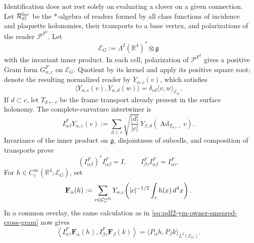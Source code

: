 Identification does not rest solely on evaluating a clover on a given connection.
Let $\mathcal R_G^{\rm loc}$ be the $*$-algebra of readers formed by all
class functions of incidence and plaquette holonomies, their transports to a
base vertex, and polarizations of the reader $\mathcal P^{F^2}$. Let
\begin{equation}\label{eq:pdf2-ym-owner-curvature-fibre}
 \mathcal E_G:=\Lambda^2(\mathbb R^4)^*\otimes\mathfrak g
\end{equation}
with the invariant inner product. In each cell, polarization of
$\mathcal P^{F^2}$ gives a positive Gram form $G_{\alpha,c}^{F}$ on
$\mathcal E_G$. Quotient by its kernel and apply its positive square root; denote
the resulting normalized reader by $Y_{\alpha,c}(v)$, which satisfies
\begin{equation}\label{eq:pdf2-ym-owner-curvature-cell-gram}
 \langle Y_{\alpha,c}(v),Y_{\alpha,d}(w)\rangle
 =\delta_{cd}\langle v,w\rangle_{\mathcal E_G}.
\end{equation}
If $d\subset c$, let $T_{d\leftarrow c}$ be the frame transport already present in the
surface holonomy. The complete-curvature intertwiner is
\begin{equation}\label{eq:pdf2-ym-owner-curvature-intertwiner}
 I_{\alpha\beta}^{F}Y_{\alpha,c}(v)
 :=\sum_{d\subset c}\sqrt{\frac{|d|}{|c|}}\,
 Y_{\beta,d}\!\left(\operatorname{Ad}_{T_{d\leftarrow c}}v\right).
\end{equation}
Invariance of the inner product on $\mathfrak g$, disjointness of subcells, and
composition of transports prove
\begin{equation}\label{eq:pdf2-ym-owner-curvature-intertwiner-identities}
 (I_{\alpha\beta}^{F})^*I_{\alpha\beta}^{F}=I,
 \qquad
 I_{\beta\gamma}^{F}I_{\alpha\beta}^{F}=I_{\alpha\gamma}^{F}.
\end{equation}
For $h\in C_c^\infty(\mathbb R^4;\mathcal E_G)$, set
\begin{equation}\label{eq:pdf2-ym-owner-f-alpha}
 \mathbf F_\alpha(h):=
 \sum_{c\in\mathcal C_\alpha^{\rm cell}}
 Y_{\alpha,c}\!\left(
   |c|^{-1/2}\int_c h(x)\,d^4x\right).
\end{equation}
In a common overlay, the same calculation as in
\eqref{eq:pdf2-ym-owner-smeared-cross-gram} now gives
\begin{equation}\label{eq:pdf2-ym-owner-curvature-cross-gram}
 \left\langle I_{\alpha\gamma}^{F}\mathbf F_\alpha(h),
 I_{\beta\gamma}^{F}\mathbf F_\beta(k)\right\rangle
 =\langle P_\alpha h,P_\beta k\rangle_{L^2(\mathcal E_G)}.
\end{equation}
